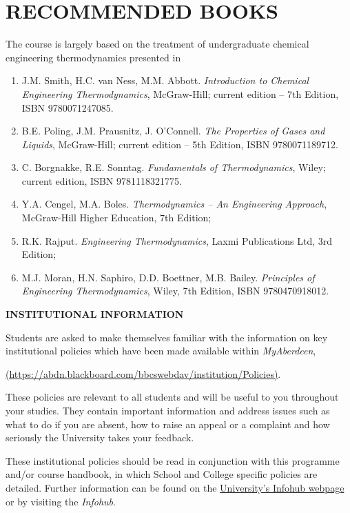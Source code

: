 \documentclass[12pts,a4paper,amsmath,amssymb,floatfix]{article}%
\begin{document}
\section{RECOMMENDED BOOKS}
The course is largely based on the treatment of undergraduate chemical engineering thermodynamics presented in
\begin{enumerate}[1.]
\item J.M. Smith, H.C. van Ness, M.M. Abbott. {\it Introduction to Chemical Engineering Thermodynamics}, McGraw-Hill; current edition – 7th Edition, ISBN 9780071247085.
\item B.E. Poling, J.M. Prausnitz, J. O’Connell. {\it The Properties of Gases and Liquids}, McGraw-Hill; current edition – 5th Edition, ISBN 9780071189712.
\item C. Borgnakke, R.E. Sonntag. {\it Fundamentals of Thermodynamics}, Wiley; current edition, ISBN 9781118321775.
\item Y.A. Cengel, M.A. Boles. {\it Thermodynamics – An Engineering Approach}, McGraw-Hill Higher Education, 7th Edition;
\item R.K. Rajput. {\it Engineering Thermodynamics},  Laxmi Publications Ltd, 3rd Edition;
\item M.J. Moran, H.N. Saphiro, D.D. Boettner, M.B. Bailey. {\it Principles of Engineering Thermodynamics}, Wiley, 7th Edition, ISBN 9780470918012.
\end{enumerate}


\bigskip

{\large {\bf INSTITUTIONAL INFORMATION}}

Students are asked to make themselves familiar with the information on key institutional policies which have been made available within {\it MyAberdeen},
\begin{center}
\href{https://abdn.blackboard.com/bbcswebdav/institution/Policies}{(https://abdn.blackboard.com/bbcswebdav/institution/Policies)}.
\end{center}
These policies are relevant to all students and will be useful to you throughout your studies. They contain important information and address issues such as what to do if you are absent, how to raise an appeal or a complaint and how seriously the University takes your feedback. 
\medskip

These institutional policies should be read in conjunction with this programme and/or course handbook, in which School and College specific policies are detailed. Further information can be found on the \href{http:www.abdn.ac.uk/infohub/}{University's Infohub webpage} or by visiting the {\it Infohub}.
\end{document}
